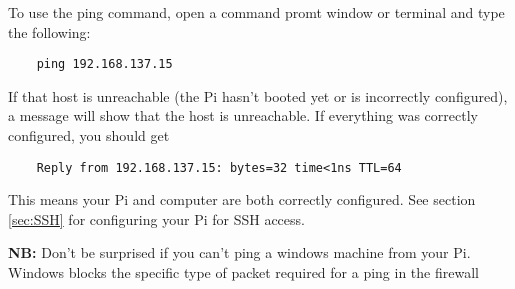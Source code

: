 To use the ping command, open a command promt window or terminal and type the following:
\begin{verbatim}
    ping 192.168.137.15
\end{verbatim}

If that host is unreachable (the Pi hasn't booted yet or is incorrectly configured), a message will show that the host is unreachable. If everything was correctly configured, you should get
\begin{verbatim}
    Reply from 192.168.137.15: bytes=32 time<1ns TTL=64
\end{verbatim}

This means your Pi and computer are both correctly configured. See section \ref{sec:SSH} for configuring your Pi for SSH access.

\textbf{NB:} Don't be surprised if you can't ping a windows machine from your Pi. Windows blocks the specific type of packet required for a ping in the firewall